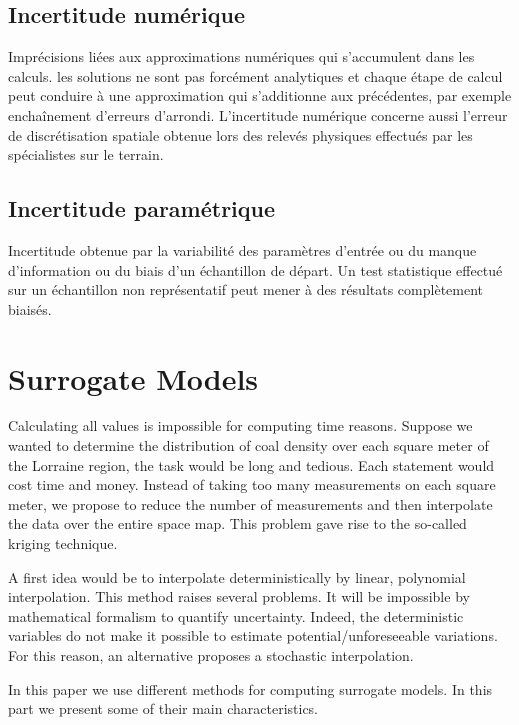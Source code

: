 \documentclass[hidelinks,12pt]{article}
\begin{document}
\subsection{Incertitude numérique}


Imprécisions liées aux approximations numériques qui s’accumulent dans les calculs. les solutions ne sont pas forcément analytiques et chaque étape de calcul peut conduire à une approximation qui s’additionne aux précédentes, par exemple enchaînement d’erreurs d’arrondi. L’incertitude numérique concerne aussi l’erreur de discrétisation spatiale obtenue lors des relevés physiques effectués par les spécialistes sur le terrain.

\subsection{Incertitude paramétrique}

Incertitude obtenue par la variabilité des paramètres d’entrée ou du manque d’information ou du biais d’un échantillon de départ. Un test statistique effectué sur un échantillon non représentatif peut mener à des résultats complètement biaisés.




\section{Surrogate Models}

Calculating all values is impossible for computing time reasons. Suppose we wanted to determine the distribution of coal density over each square meter of the Lorraine region, the task would be long and tedious. Each statement would cost time and money. Instead of taking too many measurements on each square meter, we propose to reduce the number of measurements and then interpolate the data over the entire space map. This problem gave rise to the so-called kriging technique.

A first idea would be to interpolate deterministically by linear, polynomial interpolation. This method raises several problems. It will be impossible by mathematical formalism to quantify uncertainty. Indeed, the deterministic variables do not make it possible to estimate potential/unforeseeable variations. For this reason, an alternative proposes a stochastic interpolation.

In this paper we use different methods for computing surrogate models. In this part we present some of their main characteristics.
\end{document}
